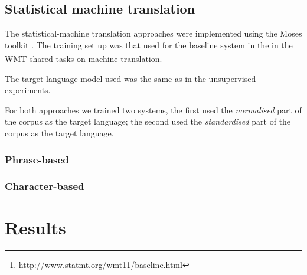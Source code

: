 \documentclass[11pt]{article}
\begin{document}
%

\subsection{Statistical machine translation}


The statistical-machine translation approaches were implemented using the 
Moses toolkit \cite{koehn2007}. The training set up was that used for
the baseline system in the  in the WMT shared tasks
on machine translation.\footnote{\url{http://www.statmt.org/wmt11/baseline.html}}

The target-language model used was the same as in the unsupervised experiments. 

For both approaches we trained two systems, the first used the \emph{normalised}
part of the corpus as the target language; the second used the \emph{standardised} 
part of the corpus as the target language.

\subsubsection{Phrase-based}

\subsubsection{Character-based}

\section{Results}
\end{document}
